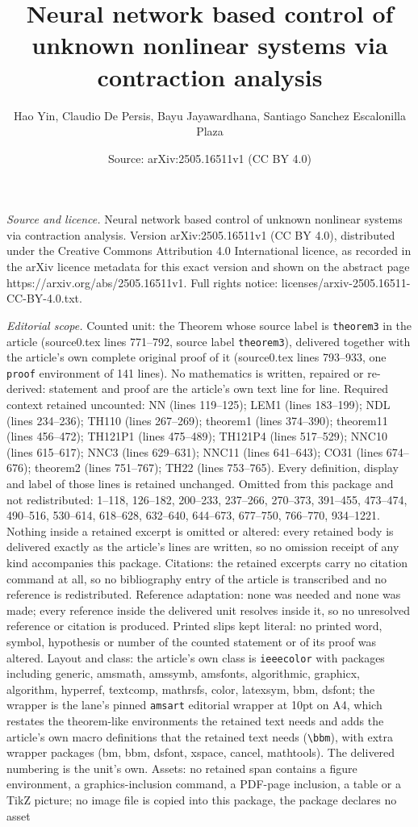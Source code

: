 \documentclass[10pt,a4paper]{amsart}
\title[Neural network based control of unknown nonlinear systems vi]{Neural network based control of unknown nonlinear systems via contraction analysis}
\author{Hao Yin, Claudio De Persis, Bayu Jayawardhana, Santiago Sanchez Escalonilla Plaza}
\date{Source: arXiv:2505.16511v1 (CC BY 4.0)}
\begin{document}
\maketitle

\noindent\emph{Source and licence.} Neural network based control of unknown nonlinear systems via contraction analysis. Version arXiv:2505.16511v1 (CC BY 4.0), distributed under the Creative Commons Attribution 4.0 International licence, as recorded in the arXiv licence metadata for this exact version and shown on the abstract page https://arxiv.org/abs/2505.16511v1. Full rights notice: licenses/arxiv-2505.16511-CC-BY-4.0.txt.\par\smallskip

\noindent\textit{Editorial scope.} Counted unit: the Theorem whose source label is \texttt{theorem3} in the article (source0.tex lines 771--792, source label \texttt{theorem3}), delivered together with the article's own complete original proof of it (source0.tex lines 793--933, one \texttt{proof} environment of 141 lines). No mathematics is written, repaired or re-derived: statement and proof are the article's own text line for line. Required context retained uncounted: NN (lines 119--125); LEM1 (lines 183--199); NDL (lines 234--236); TH110 (lines 267--269); theorem1 (lines 374--390); theorem11 (lines 456--472); TH121P1 (lines 475--489); TH121P4 (lines 517--529); NNC10 (lines 615--617); NNC3 (lines 629--631); NNC11 (lines 641--643); CO31 (lines 674--676); theorem2 (lines 751--767); TH22 (lines 753--765). Every definition, display and label of those lines is retained unchanged. Omitted from this package and not redistributed: 1--118, 126--182, 200--233, 237--266, 270--373, 391--455, 473--474, 490--516, 530--614, 618--628, 632--640, 644--673, 677--750, 766--770, 934--1221. Nothing inside a retained excerpt is omitted or altered: every retained body is delivered exactly as the article's lines are written, so no omission receipt of any kind accompanies this package. Citations: the retained excerpts carry no citation command at all, so no bibliography entry of the article is transcribed and no reference is redistributed. Reference adaptation: none was needed and none was made; every reference inside the delivered unit resolves inside it, so no unresolved reference or citation is produced. Printed slips kept literal: no printed word, symbol, hypothesis or number of the counted statement or of its proof was altered. Layout and class: the article's own class is \texttt{ieeecolor} with packages including generic, amsmath, amssymb, amsfonts, algorithmic, graphicx, algorithm, hyperref, textcomp, mathrsfs, color, latexsym, bbm, dsfont; the wrapper is the lane's pinned \texttt{amsart} editorial wrapper at 10pt on A4, which restates the theorem-like environments the retained text needs and adds the article's own macro definitions that the retained text needs (\texttt{\textbackslash bbm}), with extra wrapper packages (bm, bbm, dsfont, xspace, cancel, mathtools). The delivered numbering is the unit's own. Assets: no retained span contains a figure environment, a graphics-inclusion command, a PDF-page inclusion, a table or a TikZ picture; no image file is copied into this package, the package declares no asset 
\end{document}
